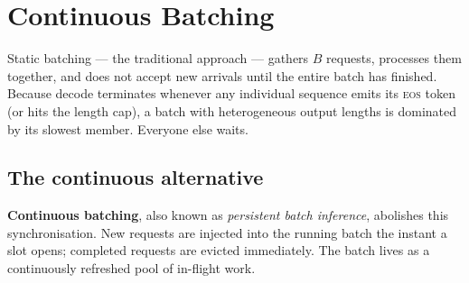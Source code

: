 \documentclass[11pt,a4paper]{article}
\theoremstyle{definition}
\theoremstyle{plain}
\begin{document}
\section{Continuous Batching}


Static batching --- the traditional approach --- gathers $B$ requests, processes them together, and does not accept new arrivals until the entire batch has finished. Because decode terminates whenever any individual sequence emits its \textsc{eos} token (or hits the length cap), a batch with heterogeneous output lengths is dominated by its slowest member. Everyone else waits.

\subsection{The continuous alternative}

\textbf{Continuous batching}, also known as \emph{persistent batch inference}, abolishes this synchronisation. New requests are injected into the running batch the instant a slot opens; completed requests are evicted immediately. The batch lives as a continuously refreshed pool of in-flight work.
\end{document}
